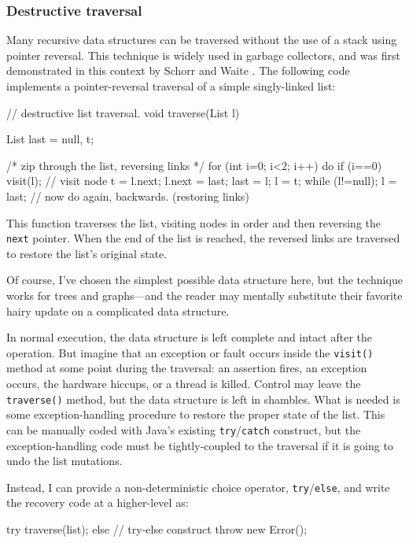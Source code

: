 \subsubsection{Destructive traversal}\label{sec:destruct}
Many recursive data structures can be traversed without the use of a
stack using pointer reversal.  This technique is widely used in
garbage collectors, and was first demonstrated in this context by
Schorr and Waite \cite{SchorrWa67}.  The following code implements a
pointer-reversal traversal of a simple singly-linked list:
\begin{inlinecode}
// destructive list traversal.
void traverse(List l) {
  List last = null, t;
  
  /* zip through the list, reversing links */
  for (int i=0; i<2; i++) {
    do {
      if (i==0) visit(l); // visit node
      t = l.next;
      l.next = last;
      last = l;
      l = t;
    } while (l!=null);
    l = last;
    // now do again, backwards. (restoring links)
  }
}
\end{inlinecode}

This function traverses the list, visiting nodes in order and then
reversing the {\tt next} pointer.  When the end of the list is
reached, the reversed links are traversed to restore the list's original
state.  

Of course, I've chosen the simplest possible data structure here, but
the technique works for trees and graphs---and the reader may mentally
substitute their favorite hairy update on a complicated data
structure.

In normal execution, the data structure is left complete and intact
after the operation.  But
imagine that an exception or fault occurs inside the {\tt visit()} method
at some point during the traversal: an assertion fires, an exception
occurs, the hardware hiccups, or a thread is killed.  Control may
leave the {\tt traverse()} method, but the data structure is left in
shambles.  What is needed is some exception-handling procedure to
restore the proper state of the list.  This can be manually coded with
Java's existing {\tt try}/{\tt catch} construct, but the
exception-handling code must be tightly-coupled to the traversal if it
is going to undo the list mutations.

Instead, I can provide a non-deterministic choice operator,
{\tt try}/{\tt else}, and write the recovery code at a higher-level as:
\begin{inlinecode}
try {
  traverse(list);
} else { // try-else construct
  throw new Error();
}
\end{inlinecode}

